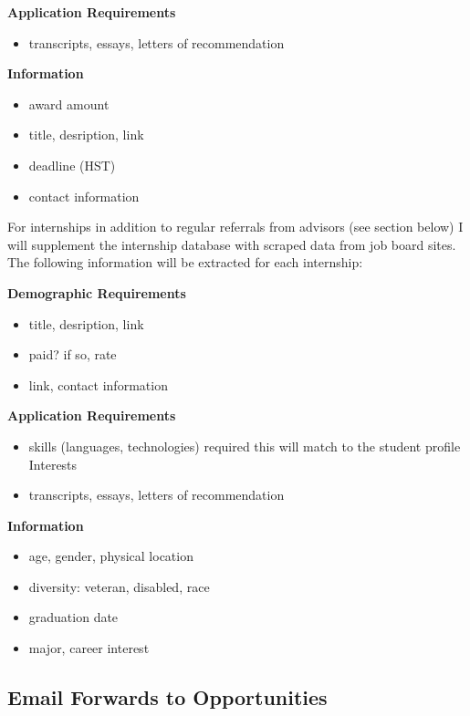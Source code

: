 \documentclass[english]{proposalnsf}
\begin{document}
			\textbf{Application Requirements}
		\begin{itemize}
			\item transcripts, essays, letters of recommendation
		\end{itemize}
		
		\textbf{Information}
		\begin{itemize}
			\item award amount
			\item title, desription, link
			\item deadline (HST)
			\item contact information
		\end{itemize}
		
		
		For internships in addition to regular referrals from advisors (see section below) I will supplement the internship database with scraped data from job board sites. The following information will be extracted for each internship:
		
		\textbf{Demographic Requirements}
		\begin{itemize}
			\item title, desription, link
			\item paid? if so, rate
			\item link, contact information
		\end{itemize}
		
		\textbf{Application Requirements}
		\begin{itemize}
			\item skills (languages, technologies) required
			\subitem this will match to the student profile Interests
			\item transcripts, essays, letters of recommendation
		\end{itemize}
	
		\textbf{Information}
		\begin{itemize}
			\item age, gender, physical location
			\item diversity: veteran, disabled, race
			\item graduation date
			\item major, career interest
		\end{itemize}
		
		
		\subsection{Email Forwards to Opportunities}
		
		
\end{document}

